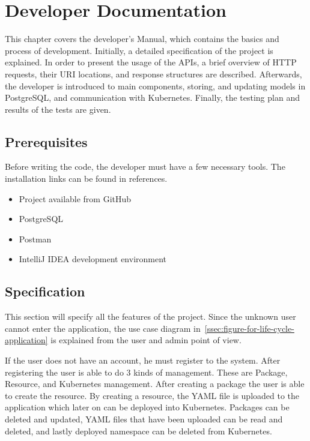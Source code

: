 \chapter{Developer Documentation} %
\label{ch:impl}
This chapter covers the developer’s Manual, which contains the basics and process of development. Initially, a detailed specification of the project is explained. In order to present the usage of the APIs, a brief overview of HTTP requests, their URI locations, and response structures are described. Afterwards, the developer is introduced to main components, storing, and updating models in PostgreSQL, and communication with Kubernetes. Finally, the testing plan and results of the tests are given.

\section{Prerequisites}
Before writing the code, the developer must have a few necessary tools. The installation links can be found in references.
\begin{itemize}
    \item Project available from GitHub~\cite{mini-eo-cm}
    \item PostgreSQL~\cite{postgresql-download}
    \item Postman~\cite{postman}
    \item IntelliJ IDEA development environment~\cite{intellij-idea}
\end{itemize}

\section{Specification}
\label{sec:specification}
This section will specify all the features of the project. Since the unknown user cannot enter the application, the use case diagram in~\autoref{ssec:figure-for-life-cycle-application} is explained from the user and admin point of view.

If the user does not have an account, he must register to the system.
After registering the user is able to do 3 kinds of management. These are Package, Resource, and Kubernetes management. After creating a package the user is able to create the resource. By creating a resource, the YAML file is uploaded to the application which later on can be deployed into Kubernetes. Packages can be deleted and updated, YAML files that have been uploaded can be read and deleted, and lastly deployed namespace can be deleted from Kubernetes. 

